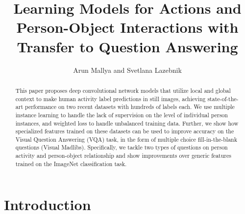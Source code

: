 \documentclass[runningheads]{llncs}
\begin{document}
\pagestyle{headings}
\mainmatter

\title{Learning Models for Actions and Person-Object Interactions with Transfer to Question Answering} 



\author{Arun Mallya and Svetlana Lazebnik}




\maketitle


\begin{abstract}

This paper proposes deep convolutional network models that utilize local and global context to make human activity label predictions in still images, achieving state-of-the-art performance on two recent datasets with hundreds of labels each. We use multiple instance learning to handle the lack of supervision on the level of individual person instances, and weighted loss to handle unbalanced training data. Further, we show how specialized features trained on these datasets can be used to improve accuracy on the Visual Question Answering (VQA) task, in the form of multiple choice fill-in-the-blank questions (Visual Madlibs). Specifically, we tackle two types of questions on person activity and person-object relationship and show improvements over generic features trained on the ImageNet classification task.











\end{abstract} 

\section{Introduction}
\label{sec:intro}
\end{document}
